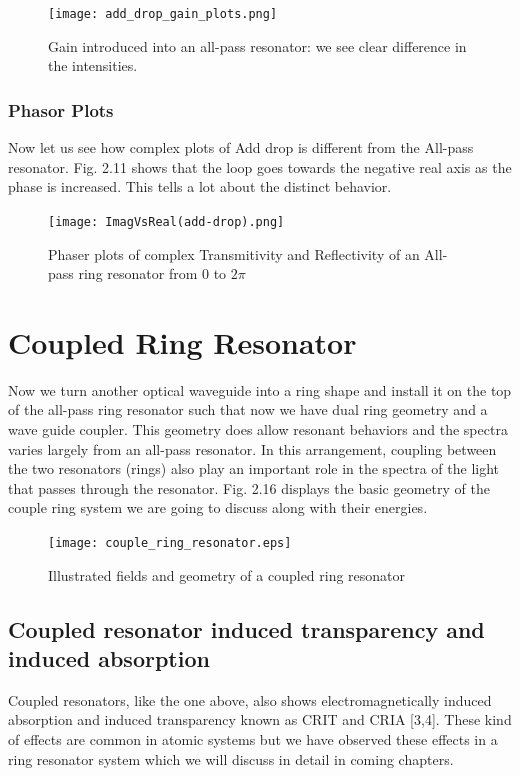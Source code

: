 \begin{figure}[h]
\centering
\texttt{[image: add\_drop\_gain\_plots.png]}
\caption{Gain introduced into an all-pass resonator: we see clear difference in the intensities.}
\end{figure}
\newpage

\subsubsection{Phasor Plots}
Now let us see how complex plots of Add drop is different from the All-pass resonator. Fig. 2.11 shows that the loop goes towards the negative real axis as the phase is increased. This tells a lot about the distinct behavior.

\begin{figure}[h]
\centering
\texttt{[image: ImagVsReal(add-drop).png]}
\caption{Phaser plots of complex Transmitivity and Reflectivity of an All-pass ring resonator from 0 to $2\pi$}
\end{figure}
\newpage

\section{Coupled Ring Resonator}
Now we turn another optical waveguide into a ring shape and install it on the top of the all-pass ring resonator such that now we have dual ring geometry and a wave guide coupler. This geometry does allow resonant behaviors and the spectra varies largely from an all-pass resonator.
In this arrangement, coupling between the two resonators (rings) also play an important role in the spectra of the light that passes through the resonator. Fig. 2.16 displays the basic geometry of the couple ring system we are going to discuss along with their energies. 

\begin{figure}[h]
\centering
\texttt{[image: couple\_ring\_resonator.eps]}
\caption{Illustrated fields and geometry of a coupled ring resonator}
\end{figure}


\subsection{Coupled resonator induced transparency and induced absorption}
Coupled resonators, like the one above, also shows electromagnetically induced absorption and induced transparency known as CRIT and CRIA [3,4]. These kind of effects are common in atomic systems but we have observed these effects in a ring resonator system which we will discuss in detail in coming chapters.


